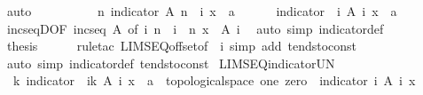 \begin{isabellebody}
\ auto\isanewline
\ \ \isamarkupfalse%
\ \isamarkupfalse%
\ \isanewline
\ \ \ \ {\isachardoublequoteopen}{\isasymAnd}n{\isachardot}\ {\isacharparenleft}indicator\ {\isacharparenleft}A\ {\isacharparenleft}n\ {\isacharplus}\ i{\isacharparenright}{\isacharparenright}\ x\ {\isacharcolon}{\isacharcolon}\ {\isacharprime}a{\isacharparenright}\ {\isacharequal}\ {}{\isachardoublequoteclose}\isanewline
\ \ \ \ {\isachardoublequoteopen}{\isacharparenleft}indicator\ {\isacharparenleft}{\isasymUnion}\ i{\isachardot}\ A\ i{\isacharparenright}\ x\ {\isacharcolon}{\isacharcolon}\ {\isacharprime}a{\isacharparenright}\ {\isacharequal}\ {}{\isachardoublequoteclose}\isanewline
\ \ \ \ \isamarkupfalse%
\ incseqD{\isacharbrackleft}OF\ {\isacharbackquoteopen}incseq\ A{\isacharbackquoteclose}{\isacharcomma}\ of\ i\ {\isachardoublequoteopen}n\ {\isacharplus}\ i{\isachardoublequoteclose}\ \ n{\isacharbrackright}\ {\isacharbackquoteopen}x\ {\isasymin}\ A\ i{\isacharbackquoteclose}\ \isamarkupfalse%
\ {\isacharparenleft}auto\ simp{\isacharcolon}\ indicator{\isacharunderscore}def{\isacharparenright}\isanewline
\ \ \isamarkupfalse%
\ \isamarkupfalse%
\ {\isacharquery}thesis\isanewline
\ \ \ \ \isamarkupfalse%
\ {\isacharparenleft}rule{\isacharunderscore}tac\ LIMSEQ{\isacharunderscore}offset{\isacharbrackleft}of\ {\isacharunderscore}\ i{\isacharbrackright}{\isacharparenright}\ {\isacharparenleft}simp\ add{\isacharcolon}\ tendsto{\isacharunderscore}const{\isacharparenright}\isanewline
{}\isamarkupfalse%
\ {\isacharparenleft}auto\ simp{\isacharcolon}\ indicator{\isacharunderscore}def\ tendsto{\isacharunderscore}const{\isacharparenright}%
\endisatagproof
{\isafoldproof}%
%
\isadelimproof
\isanewline
%
\endisadelimproof
\isanewline
{}\isamarkupfalse%
\ LIMSEQ{\isacharunderscore}indicator{\isacharunderscore}UN{\isacharcolon}\isanewline
\ \ {\isachardoublequoteopen}{\isacharparenleft}{\isasymlambda}k{\isachardot}\ indicator\ {\isacharparenleft}{\isasymUnion}\ i{\isacharless}k{\isachardot}\ A\ i{\isacharparenright}\ x\ {\isacharcolon}{\isacharcolon}\ {\isacharprime}a\ {\isacharcolon}{\isacharcolon}\ {\isacharbraceleft}topological{\isacharunderscore}space{\isacharcomma}\ one{\isacharcomma}\ zero{\isacharbraceright}{\isacharparenright}\ {\isacharminus}{\isacharminus}{\isacharminus}{\isacharminus}{\isachargreater}\ indicator\ {\isacharparenleft}{\isasymUnion}i{\isachardot}\ A\ i{\isacharparenright}\ x{\isachardoublequoteclose}\isanewline

\end{isabellebody}
